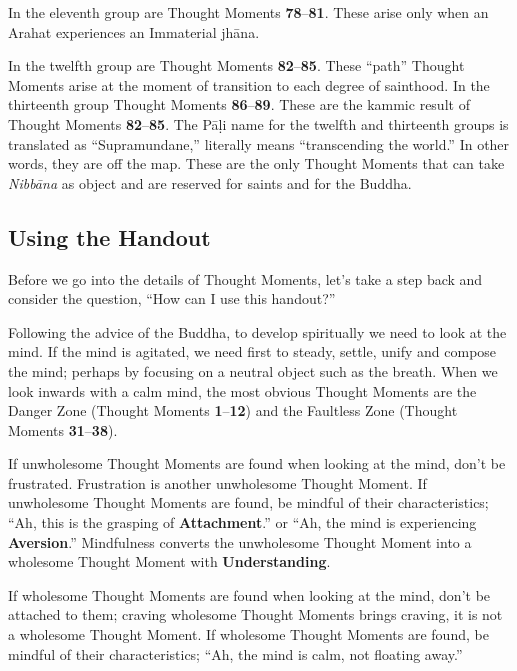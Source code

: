 In the eleventh group are Thought Moments \textbf{78}--\textbf{81}. These arise only when an Arahat experiences an Immaterial jhāna.

In the twelfth group are Thought Moments \textbf{82}--\textbf{85}. These “path” Thought Moments arise at the moment of transition to each degree of sainthood. In the thirteenth group Thought Moments \textbf{86}--\textbf{89}. These are the kammic result of Thought Moments \textbf{82}--\textbf{85}. The Pāḷi name for the twelfth and thirteenth groups is translated as “Supramundane,” literally means “transcending the world.” In other words, they are off the map. These are the only Thought Moments that can take \textit{Nibbāna} as object and are reserved for saints and for the Buddha.

\subsection*{Using the Handout}

Before we go into the details of Thought Moments, let’s take a step back and consider the question, “How can I use this handout?”

Following the advice of the Buddha, to develop spiritually we need to look at the mind. If the mind is agitated, we need first to steady, settle, unify and compose the mind; perhaps by focusing on a neutral object such as the breath. When we look inwards with a calm mind, the most obvious Thought Moments are the Danger Zone (Thought Moments \textbf{1}--\textbf{12}) and the Faultless Zone (Thought Moments \textbf{31}--\textbf{38}).

If unwholesome Thought Moments are found when looking at the mind, don’t be frustrated. Frustration is another unwholesome Thought Moment. If unwholesome Thought Moments are found, be mindful of their characteristics; “Ah, this is the grasping of \textbf{Attachment}.” or “Ah, the mind is experiencing \textbf{Aversion}.” Mindfulness converts the unwholesome Thought Moment into a wholesome Thought Moment with \textbf{Understanding}.

If wholesome Thought Moments are found when looking at the mind, don’t be attached to them; craving wholesome Thought Moments brings craving, it is not a wholesome Thought Moment. If wholesome Thought Moments are found, be mindful of their characteristics; “Ah, the mind is calm, not floating away.”

